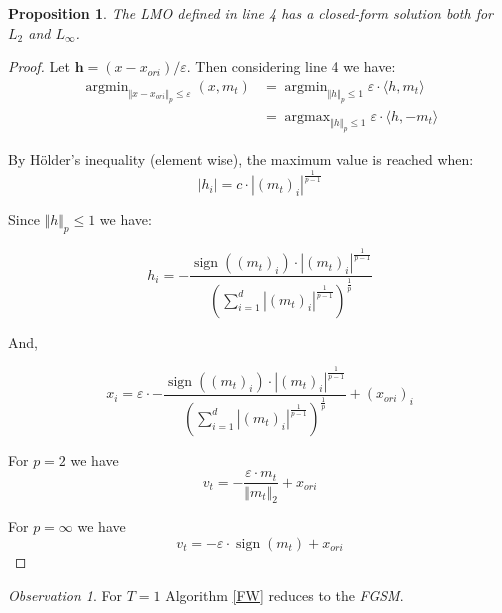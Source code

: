 \documentclass[10pt,twocolumn,letterpaper, english]{article}
\newcommand{\sign}{\mathop{\mathrm{sign}}}
\newcommand{\argmin}{\mathop{\mathrm{argmin}}}
\newcommand{\argmax}{\mathop{\mathrm{argmax}}}
\theoremstyle{definition}
\theoremstyle{plain}
\theoremstyle{plain}
\theoremstyle{plain}
\theoremstyle{plain}
\newtheorem{prop}{Proposition}[subsection]
\theoremstyle{remark}
\newtheorem{osservazione}{Observation}[section]
\theoremstyle{remark}
\theoremstyle{definition}
\theoremstyle{definition}
\theoremstyle{definition}
\theoremstyle{definition}
\renewcommand{\epsilon}{\varepsilon}
\begin{document}
\begin{prop}The LMO defined in line 4 has a closed-form solution both for $L_2$ and $L_\infty$. \\
\end{prop}
\begin{proof}
Let $\textbf{h}=(x - x_{ori})/ \epsilon$. Then considering line 4 we have:
\begin{align*}
    \argmin_{\Vert x - x_{ori} \Vert_p \le \epsilon} (x, m_t) &= \argmin_{\Vert h \Vert_p \le 1} \epsilon \cdot \langle h,m_t \rangle \\
    &= \argmax_{\Vert h \Vert_p \le 1} \epsilon \cdot \langle h, -m_t \rangle 
\end{align*}

By H\"{o}lder's inequality (element wise), the maximum value is reached when: 
\begin{equation*}
    \left | h_i \right | = c \cdot \left | (m_t)_i \right |^{\frac{1}{p-1}}
\end{equation*}

Since $\Vert h \Vert_p \le 1$ we have:

\begin{equation*}
    h_i= - \frac{\sign((m_t)_i)\cdot \left | (m_t)_i \right |^{\frac{1}{p-1}}}{(\sum_{i=1}^d \left | (m_t)_i \right |^{\frac{1}{p-1}} )^{\frac{1}{p}}}
\end{equation*}

And,


\begin{equation*}
      x_i=\epsilon \cdot - \frac{\sign((m_t)_i)\cdot \left | (m_t)_i \right |^{\frac{1}{p-1}}}{(\sum_{i=1}^d \left | (m_t)_i \right |^{\frac{1}{p-1}} )^{\frac{1}{p}}} + (x_{ori})_i
\end{equation*}

For $p=2$ we have
\begin{equation*}
    v_t= - \frac{\epsilon \cdot m_t}{\Vert m_t \Vert_2} + x _{ori}
\end{equation*}

For $p= \infty$ we have
\begin{equation*}
    v_t = - \epsilon \cdot \sign(m_t) + x_{ori}
\end{equation*}
\end{proof}

\begin{osservazione}
For $T=1$ Algorithm \ref{FW} reduces to the \textit{FGSM}.
\end{osservazione}
\end{document}
